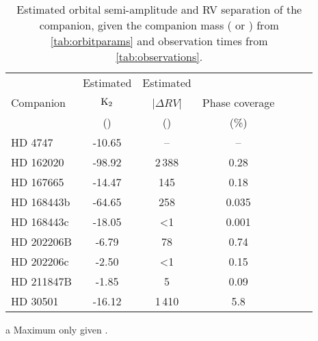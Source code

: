 \begin{table*}
    \small
    \centering
    \begin{threeparttable}[b]
        \caption{Estimated orbital semi-amplitude and {RV} separation of the companion, given the companion mass (\Mtwo{} or \Mtwosini{}) from \cref{tab:orbitparams} and observation times from \cref{tab:observations}.}
        \begin{tabular}{l c c c c c c}%
            \toprule
             & Estimated & Estimated & & \\  %
             Companion & \(\rm K_2\) & |\(\Delta {RV}\)| & Phase coverage\\
             & (\kmps{}) & (\mps{}) & (\%)\\
             \midrule
             {HD 4747} & -10.65 & -- & --\\  %
             {HD 162020} & -98.92\tnote{a} & 2\,388 & 0.28\\  %
             {HD 167665} & -14.47\tnote{a} & 145 & 0.18\\  %
             {HD 168443b} & -64.65\tnote{a} & 258 & 0.035\\
             {HD 168443c} & -18.05\tnote{a} & <1 & 0.001\\  %
             {HD 202206}B & -6.79 & 78 & 0.74\\  %
             {HD 202206}c & -2.50 & <1 & 0.15\\  %
             {HD 211847}B & -1.85 & 5 & 0.09\\  %
             {HD 30501} & -16.12 & 1\,410 & 5.8\\
             \bottomrule
         \end{tabular}\label{tab:estimated_rv}
         \begin{tablenotes}
            \item[a] {Maximum \Ktwo{} only given \Mtwosini.}
         \end{tablenotes}
    \end{threeparttable}
\end{table*}
